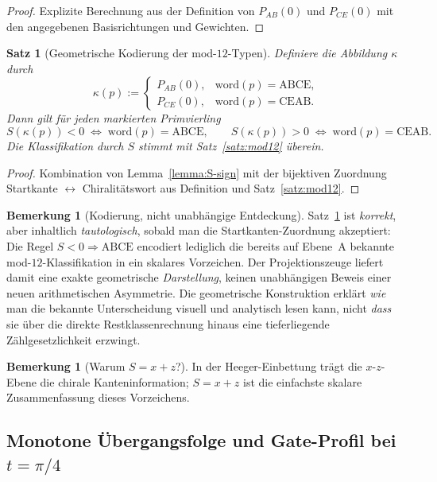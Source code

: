 \documentclass[11pt,a4paper]{article}
\theoremstyle{definition}
\newtheorem{bemerkung}[definition]{Bemerkung}
\theoremstyle{plain}
\newtheorem{satz}[definition]{Satz}
\begin{document}
	\begin{proof}
		Explizite Berechnung aus der Definition von $P_{AB}(0)$ und $P_{CE}(0)$ mit den angegebenen Basisrichtungen und Gewichten.
	\end{proof}
	
	\begin{satz}[Geometrische Kodierung der mod-$12$-Typen]\label{satz:kodierung}
		Definiere die Abbildung $\kappa$ durch
		\[
		\kappa(p):=
		\begin{cases}
			P_{AB}(0), & \mathrm{word}(p)=\mathrm{ABCE},\\
			P_{CE}(0), & \mathrm{word}(p)=\mathrm{CEAB}.
		\end{cases}
		\]
		Dann gilt für jeden markierten Primvierling
		\[
		S(\kappa(p))<0\;\Longleftrightarrow\;\mathrm{word}(p)=\mathrm{ABCE},\qquad
		S(\kappa(p))>0\;\Longleftrightarrow\;\mathrm{word}(p)=\mathrm{CEAB}.
		\]
		Die Klassifikation durch $S$ stimmt mit Satz~\ref{satz:mod12} überein.
	\end{satz}
	
	\begin{proof}
		Kombination von Lemma~\ref{lemma:S-sign} mit der bijektiven Zuordnung Startkante $\leftrightarrow$ Chiralitätswort aus Definition und Satz~\ref{satz:mod12}.
	\end{proof}
	
	\begin{bemerkung}[Kodierung, nicht unabhängige Entdeckung]\label{bem:tautologie}
		Satz~\ref{satz:kodierung} ist \emph{korrekt}, aber inhaltlich \emph{tautologisch}, sobald man die Startkanten-Zuordnung akzeptiert: Die Regel $S<0\Rightarrow\mathrm{ABCE}$ encodiert lediglich die bereits auf Ebene~A bekannte mod-$12$-Klassifikation in ein skalares Vorzeichen. Der Projektionszeuge liefert damit eine exakte geometrische \emph{Darstellung}, keinen unabhängigen Beweis einer neuen arithmetischen Asymmetrie. Die geometrische Konstruktion erklärt \emph{wie} man die bekannte Unterscheidung visuell und analytisch lesen kann, nicht \emph{dass} sie über die direkte Restklassenrechnung hinaus eine tieferliegende Zählgesetzlichkeit erzwingt.
	\end{bemerkung}
	
	\begin{bemerkung}[Warum $S=x+z$?]
		In der Heeger-Einbettung trägt die $x$-$z$-Ebene die chirale Kanteninformation; $S=x+z$ ist die einfachste skalare Zusammenfassung dieses Vorzeichens.
	\end{bemerkung}
	
	\subsection{Monotone Übergangsfolge und Gate-Profil bei $t=\pi/4$}
	
\end{document}
